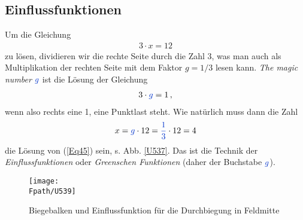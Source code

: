 {{{%
{\textcolor{sectionTitleBlue}{\subsection{Einflussfunktionen}}}
Um die Gleichung
\begin{align}\label{Eq45}
3\cdot x = 12
\end{align}
zu l\"{o}sen, dividieren wir die rechte Seite durch die Zahl 3, was man auch als Multiplikation der rechten Seite mit dem Faktor $g = 1/3$ lesen kann. {\em \glq The magic number\grq{}\/} $\textcolor{chapterTitleBlue}{g}$ ist die L\"{o}sung der Gleichung
\begin{align}
3\cdot \textcolor{chapterTitleBlue}{g} = 1\,,
\end{align}
wenn also rechts eine 1, eine \glq Punktlast\grq{} steht. Wie nat\"{u}rlich muss dann
die Zahl
\begin{align}
x = \textcolor{chapterTitleBlue}{g} \cdot 12 = \textcolor{chapterTitleBlue}{\frac{1}{3}}\cdot 12 = 4
\end{align}
die L\"{o}sung von (\ref{Eq45}) sein, s. Abb. \ref{U537}. Das ist die Technik der {\em Einflussfunktionen\/} oder {\em Greenschen Funktionen\/} (daher der Buchstabe $\textcolor{chapterTitleBlue}{g}$).

\begin{figure}[tbp]
\centering
\if {} \sidecaption \fi
\texttt{[image: \\Fpath/U539]}
\caption{Biegebalken und Einflussfunktion f\"{u}r die Durchbiegung in Feldmitte} \label{U539}
%
\end{figure}%

}}}
